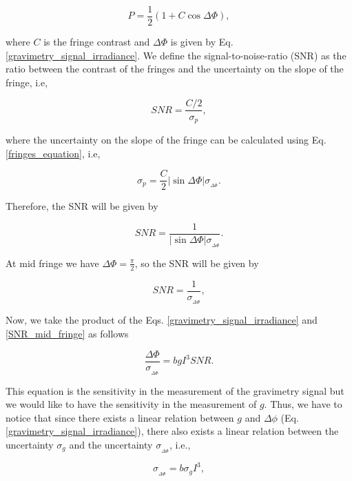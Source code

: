 \documentclass{article}
\begin{document}
\begin{equation}\label{fringes_equation}
    P = \frac{1}{2}(1+C\cos{\Delta \Phi}),
\end{equation}

where $C$ is the fringe contrast and $\Delta \Phi$ is given by Eq. \ref{gravimetry_signal_irradiance}. We define the signal-to-noise-ratio (SNR) as the ratio between the contrast of the fringes and the uncertainty on the slope of the fringe, i.e,

\begin{equation}
    SNR = \frac{C/2}{\sigma_{p}}, 
\end{equation}

where the uncertainty on the slope of the fringe can be calculated using Eq. \ref{fringes_equation}, i.e,

\begin{equation}
    \sigma_{p} = \frac{C}{2} |\sin{\Delta \Phi}| \sigma_{_{\Delta \Phi}}.
\end{equation}

Therefore, the SNR will be given by

\begin{equation}
    SNR = \frac{1}{|\sin{\Delta \Phi}|  \sigma_{_{\Delta \Phi}}}.
\end{equation}

At mid fringe we have $\Delta \Phi = \frac{\pi}{2}$, so the SNR will be given by

\begin{equation}\label{SNR_mid_fringe}
    SNR = \frac{1}{\sigma_{_{\Delta \Phi}}},
\end{equation}

Now, we take the product of the Eqs. \ref{gravimetry_signal_irradiance} and \ref{SNR_mid_fringe} as follows

\begin{equation}\label{sensitivity_in_phase}
    \frac{\Delta \Phi}{\sigma_{_{\Delta \Phi}}} = b g I^3 SNR.
\end{equation}

This equation is the sensitivity in the measurement of the gravimetry signal but we would like to have the sensitivity in the measurement of $g$. Thus,
we have to notice that since there exists a linear relation between $g$ and $\Delta \phi$ (Eq. \ref{gravimetry_signal_irradiance}), there also exists a linear relation between the uncertainty $\sigma_{g}$ and the uncertainty $\sigma_{_{\Delta \Phi}}$, i.e.,

\begin{equation}
    \sigma_{_{\Delta \Phi}} = b \sigma_{g} I^3,
\end{equation}
\end{document}
